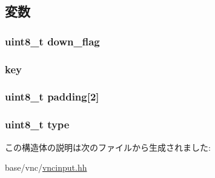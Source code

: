 \subsection{変数}
\hypertarget{structVncInput_1_1KeyEventMessage_a728d39583ca6e83a2a487f0639c4231e}{
\subsubsection[{down\_\-flag}]{\setlength{\rightskip}{0pt plus 5cm}uint8\_\-t {\bf down\_\-flag}}}
\label{structVncInput_1_1KeyEventMessage_a728d39583ca6e83a2a487f0639c4231e}
\hypertarget{structVncInput_1_1KeyEventMessage_a6d4ec8e4f3148d51041635da9986c3fa}{
\subsubsection[{key}]{ {\bf key}}}
\label{structVncInput_1_1KeyEventMessage_a6d4ec8e4f3148d51041635da9986c3fa}
\hypertarget{structVncInput_1_1KeyEventMessage_adc9958438bc5e8eb9b9b9ade76e37e79}{
\subsubsection[{padding}]{\setlength{\rightskip}{0pt plus 5cm}uint8\_\-t {\bf padding}\mbox{[}2\mbox{]}}}
\label{structVncInput_1_1KeyEventMessage_adc9958438bc5e8eb9b9b9ade76e37e79}
\hypertarget{structVncInput_1_1KeyEventMessage_a1d127017fb298b889f4ba24752d08b8e}{
\subsubsection[{type}]{\setlength{\rightskip}{0pt plus 5cm}uint8\_\-t {\bf type}}}
\label{structVncInput_1_1KeyEventMessage_a1d127017fb298b889f4ba24752d08b8e}


この構造体の説明は次のファイルから生成されました:\begin{DoxyCompactItemize}
\item 
base/vnc/\hyperlink{vncinput_8hh}{vncinput.hh}\end{DoxyCompactItemize}
